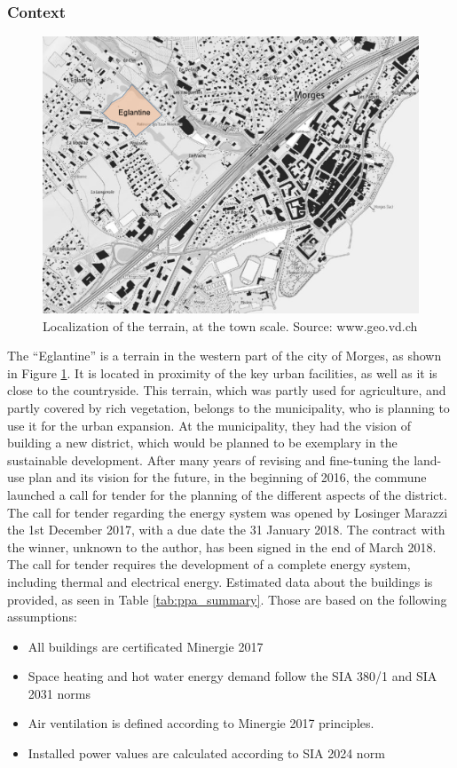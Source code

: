 \documentclass{article}
\begin{document}
\subsubsection{Context}

\begin{figure}[h!]
\centering
\includegraphics[width=1\textwidth]{morges.png}
\caption{Localization of the terrain, at the town scale. Source: www.geo.vd.ch}
\label{fig:morges}
\end{figure}

The “Eglantine” is a terrain in the western part of the city of Morges, as shown in Figure \ref{fig:morges}. It is located in proximity of the key urban facilities, as well as it is close to the countryside. This terrain, which was partly used for agriculture, and partly covered by rich vegetation, belongs to the municipality, who is planning to use it for the urban expansion. At the municipality, they had the vision of building a new district, which would be planned to be exemplary in the sustainable development. After many years of revising and fine-tuning the land-use plan and its vision for the future, in the beginning of 2016, the commune launched a call for tender for the planning of the different aspects of the district. The call for tender regarding the energy system was opened by Losinger Marazzi the 1st December 2017, with a due date the 31 January 2018. The contract with the winner, unknown to the author, has been signed in the end of March 2018. \\

The call for tender requires the development of a complete energy system, including thermal and electrical energy. Estimated data about the buildings is provided, as seen in Table \ref{tab:ppa_summary}. Those are based on the following assumptions:
\begin{itemize}
    \item All buildings are certificated Minergie 2017
    \item Space heating and hot water energy demand follow the SIA 380/1 and SIA 2031 norms
    \item Air ventilation is defined according to Minergie 2017 principles.
    \item Installed power values are calculated according to SIA 2024 norm
\end{itemize}
\end{document}
